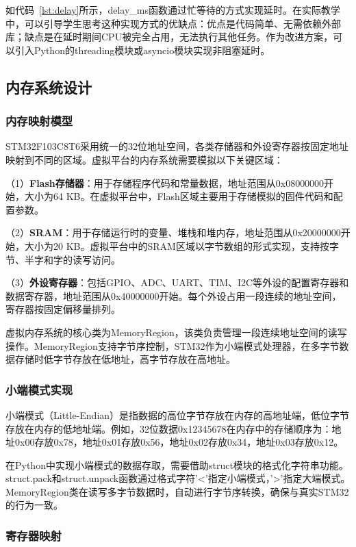 \documentclass[12pt,a4paper]{ctexart}
\begin{document}
如代码~\ref{lst:delay}所示，delay\_ms函数通过忙等待的方式实现延时。在实际教学中，可以引导学生思考这种实现方式的优缺点：优点是代码简单、无需依赖外部库；缺点是在延时期间CPU被完全占用，无法执行其他任务。作为改进方案，可以引入Python的threading模块或asyncio模块实现非阻塞延时。

\subsection{内存系统设计}

\subsubsection{内存映射模型}

STM32F103C8T6采用统一的32位地址空间，各类存储器和外设寄存器按固定地址映射到不同的区域。虚拟平台的内存系统需要模拟以下关键区域：

（1）\textbf{Flash存储器}：用于存储程序代码和常量数据，地址范围从0x08000000开始，大小为64 KB。在虚拟平台中，Flash区域主要用于存储模拟的固件代码和配置参数。

（2）\textbf{SRAM}：用于存储运行时的变量、堆栈和堆内存，地址范围从0x20000000开始，大小为20 KB。虚拟平台中的SRAM区域以字节数组的形式实现，支持按字节、半字和字的读写访问。

（3）\textbf{外设寄存器}：包括GPIO、ADC、UART、TIM、I2C等外设的配置寄存器和数据寄存器，地址范围从0x40000000开始。每个外设占用一段连续的地址空间，寄存器按固定偏移量排列。

虚拟内存系统的核心类为MemoryRegion，该类负责管理一段连续地址空间的读写操作。MemoryRegion支持字节序控制，STM32作为小端模式处理器，在多字节数据存储时低字节存放在低地址，高字节存放在高地址。

\subsubsection{小端模式实现}

小端模式（Little-Endian）是指数据的高位字节存放在内存的高地址端，低位字节存放在内存的低地址端。例如，32位数据0x12345678在内存中的存储顺序为：地址0x00存放0x78，地址0x01存放0x56，地址0x02存放0x34，地址0x03存放0x12。

在Python中实现小端模式的数据存取，需要借助struct模块的格式化字符串功能。struct.pack和struct.unpack函数通过格式字符'<'指定小端模式，'>'指定大端模式。MemoryRegion类在读写多字节数据时，自动进行字节序转换，确保与真实STM32的行为一致。

\subsubsection{寄存器映射}
\end{document}
